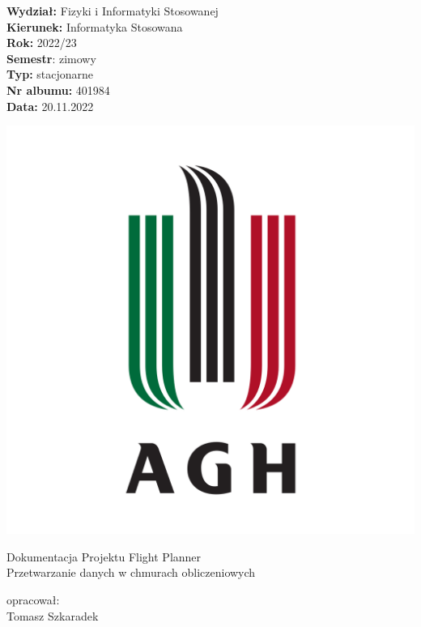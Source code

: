 \documentclass[12pt]{article}
\begin{document}
\begin{flushright}
\textbf{Wydział:} Fizyki i Informatyki Stosowanej\\
\textbf{Kierunek:} Informatyka Stosowana\\
\textbf{Rok:} 2022/23\\
\textbf{Semestr}: zimowy\\
\textbf{Typ:} stacjonarne\\
\textbf{Nr albumu:} 401984\\
\textbf{Data:} 20.11.2022\\
\end{flushright}

\begin{center}
\includegraphics[scale=0.15]{AGH}
\\[0.3cm]
\begin{LARGE}
\textsf{Dokumentacja Projektu Flight Planner\\
Przetwarzanie danych w chmurach obliczeniowych
\\[1cm]}
\end{LARGE}
\end{center}

\tableofcontents
\vspace*{\fill}

\begin{LARGE}
\begin{flushleft}
{\Large opracował:\\
Tomasz Szkaradek\par}
\end{flushleft}
\end{LARGE}
\end{document}

